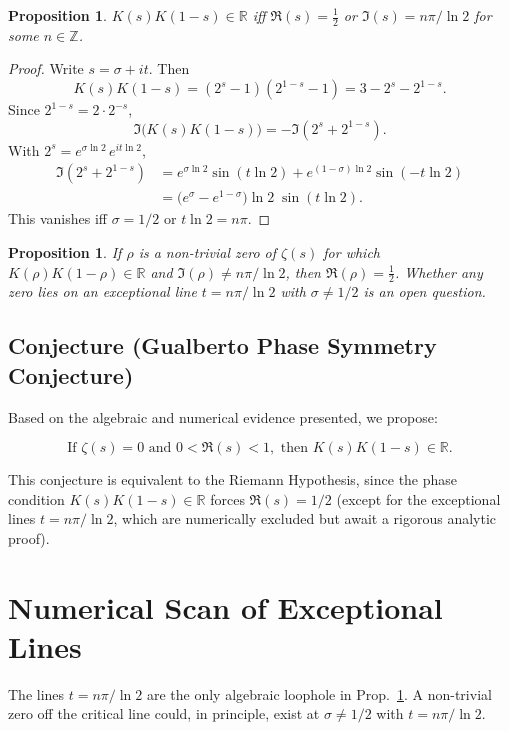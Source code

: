 \documentclass[12pt,a4paper]{article}
\theoremstyle{plain}
\newtheorem{proposition}[theorem]{Proposition}
\begin{document}
\begin{proposition}
\label{prop:symmetry}
$K(s)K(1-s)\in\mathbb{R}$ iff $\Re(s)=\tfrac12$ or
$\Im(s)=n\pi/\ln2$ for some $n\in\mathbb{Z}$.
\end{proposition}
\begin{proof}
Write $s=\sigma+it$.  Then
\[
K(s)K(1-s) = (2^s-1)(2^{1-s}-1) = 3 - 2^s - 2^{1-s}.
\]
Since $2^{1-s}=2\cdot2^{-s}$,
\[
\Im\bigl(K(s)K(1-s)\bigr) = -\Im(2^s + 2^{1-s}).
\]
With $2^s = e^{\sigma\ln2}\,e^{it\ln2}$,
\begin{align*}
\Im(2^s + 2^{1-s})
&= e^{\sigma\ln2}\sin(t\ln2)
   + e^{(1-\sigma)\ln2}\sin(-t\ln2)\\
&= \bigl(e^{\sigma} - e^{1-\sigma}\bigr)\ln2\;\sin(t\ln2).
\end{align*}
This vanishes iff $\sigma=1/2$ or $t\ln2=n\pi$.
\end{proof}

\begin{proposition}
\label{teo:equiv}
If $\rho$ is a non-trivial zero of $\zeta(s)$ for which
$K(\rho)K(1-\rho)\in\mathbb{R}$ and $\Im(\rho)\neq n\pi/\ln2$,
then $\Re(\rho)=\tfrac12$.  Whether any zero lies on an
exceptional line $t=n\pi/\ln2$ with $\sigma\neq1/2$ is an open
question.
\end{proposition}

\subsection*{Conjecture (Gualberto Phase Symmetry Conjecture)}

Based on the algebraic and numerical evidence presented, we propose:

\[
\boxed{
\text{If }\zeta(s)=0\text{ and }0<\Re(s)<1,\text{ then }K(s)K(1-s)\in\mathbb{R}.
}
\]

This conjecture is equivalent to the Riemann Hypothesis, since the
phase condition $K(s)K(1-s)\in\mathbb{R}$ forces $\Re(s)=1/2$
(except for the exceptional lines $t=n\pi/\ln2$, which are
numerically excluded but await a rigorous analytic proof).

\section{Numerical Scan of Exceptional Lines}
\label{sec:scan}

The lines $t=n\pi/\ln2$ are the only algebraic loophole in
Prop.~\ref{prop:symmetry}.  A non-trivial zero off the critical
line could, in principle, exist at $\sigma\neq1/2$ with
$t=n\pi/\ln2$.
\end{document}
